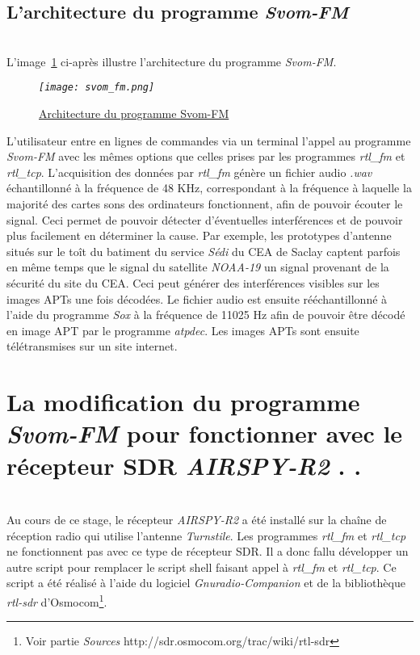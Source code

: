 \documentclass[12pt,fleqn]{book} %
\begin{document}
\subsection{L'architecture du programme \emph{Svom-FM}}
~\\\indent L'image~\underline{\color{blue}\ref{svom_fm}} ci-après illustre l'architecture du programme \emph{Svom-FM}.
\begin{figure}[H]
	\centering
	\itshape
	\texttt{[image: svom\_fm.png]}
	\caption{\label{svom_fm} \underline{Architecture du programme Svom-FM}}
\end{figure}
\noindent L'utilisateur entre en lignes de commandes via un terminal l'appel au programme \emph{Svom-FM} avec les mêmes options que celles prises par les programmes \emph{rtl\_fm} et \emph{rtl\_tcp}. L'acquisition des données par \emph{rtl\_fm} génère un fichier audio \emph{.wav} échantillonné à la fréquence de 48 KHz, correspondant à la fréquence à laquelle la majorité des cartes sons des ordinateurs fonctionnent, afin de pouvoir écouter le signal. Ceci permet de pouvoir détecter d'éventuelles interférences et de pouvoir plus facilement en déterminer la cause. Par exemple, les prototypes d'antenne situés sur le toît du batiment du service \emph{Sédi} du CEA de Saclay captent parfois en même temps que le signal du satellite \emph{NOAA-19} un signal provenant de la sécurité du site du CEA. Ceci peut générer des interférences visibles sur les images APTs une fois décodées.
Le fichier audio est ensuite rééchantillonné à l'aide du programme \emph{Sox} à la fréquence de 11025 Hz afin de pouvoir être décodé en image APT par le programme \emph{atpdec}. Les images APTs sont ensuite télétransmises sur un site internet.
\section{La modification du programme \emph{Svom-FM} pour fonctionner avec le récepteur SDR \emph{AIRSPY-R2}     \color{white}. .}
~\\\indent Au cours de ce stage, le récepteur \emph{AIRSPY-R2} a été installé sur la chaîne de réception radio qui utilise l'antenne \emph{Turnstile}. Les programmes \emph{rtl\_fm} et \emph{rtl\_tcp} ne fonctionnent pas avec ce type de récepteur SDR. Il a donc fallu développer un autre script pour remplacer le script shell faisant appel à \emph{rtl\_fm} et \emph{rtl\_tcp}.
Ce script a été réalisé à l'aide du logiciel \emph{Gnuradio-Companion} et de la bibliothèque \emph{rtl-sdr} d'Osmocom\footnote{Voir partie \emph{Sources} http://sdr.osmocom.org/trac/wiki/rtl-sdr}. 
\end{document}
